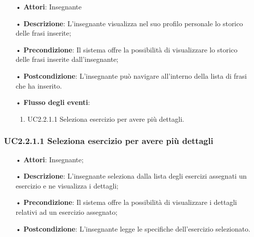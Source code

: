 \begin{itemize}
	\item[•] \textbf{Attori}:  Insegnante	\item[•] \textbf{Descrizione}: L’insegnante visualizza nel suo profilo personale lo storico delle frasi inserite; 
	\item[•] \textbf{Precondizione}: Il sistema offre la possibilità di visualizzare lo storico delle frasi inserite dall’insegnante;
	\item[•] \textbf{Postcondizione}:  L’insegnante può navigare all’interno della lista di frasi che ha inserito.
	\item[•] \textbf{Flusso degli eventi}:
		\begin{enumerate}
			\item UC2.2.1.1  Seleziona esercizio per avere più dettagli.
		\end{enumerate}
\end{itemize}

\subsubsection{UC2.2.1.1 Seleziona esercizio per avere più dettagli}
\begin{itemize}
	\item[•] \textbf{Attori}: Insegnante;
	\item[•] \textbf{Descrizione}:  L’insegnante seleziona dalla lista degli esercizi assegnati un esercizio e ne visualizza i dettagli;
	\item[•] \textbf{Precondizione}: Il sistema offre la possibilità di visualizzare i dettagli relativi ad un esercizio assegnato;
	\item[•] \textbf{Postcondizione}: L’insegnante legge le specifiche dell’esercizio selezionato.
\end{itemize}

